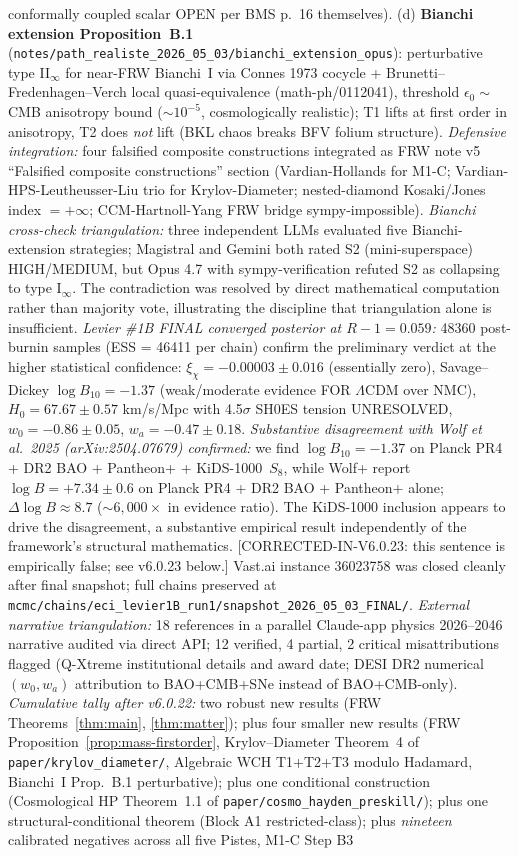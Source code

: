 \documentclass[reprint,amsmath,amssymb,aps,prd,superscriptaddress]{revtex4-2}
\providecommand{\1}{\mathbf{1}}
\begin{document}
conformally coupled scalar OPEN per BMS p.~16 themselves). (d) \textbf{Bianchi extension Proposition~B.1} (\texttt{notes/path\_realiste\_2026\_05\_03/bianchi\_extension\_opus}): perturbative type II$_\infty$ for near-FRW Bianchi~I via Connes 1973 cocycle + Brunetti--Fredenhagen--Verch local quasi-equivalence (math-ph/0112041), threshold $\epsilon_0\sim$ CMB anisotropy bound ($\sim 10^{-5}$, cosmologically realistic); T1 lifts at first order in anisotropy, T2 does \emph{not} lift (BKL chaos breaks BFV folium structure). \emph{Defensive integration:} four falsified composite constructions integrated as FRW note v5 ``Falsified composite constructions'' section (Vardian-Hollands for M1-C; Vardian-HPS-Leutheusser-Liu trio for Krylov-Diameter; nested-diamond Kosaki/Jones index $=+\infty$; CCM-Hartnoll-Yang FRW bridge sympy-impossible). \emph{Bianchi cross-check triangulation:} three independent LLMs evaluated five Bianchi-extension strategies; Magistral and Gemini both rated S2 (mini-superspace) HIGH/MEDIUM, but Opus 4.7 with sympy-verification refuted S2 as collapsing to type I$_\infty$. The contradiction was resolved by direct mathematical computation rather than majority vote, illustrating the discipline that triangulation alone is insufficient. \emph{Levier \#1B FINAL converged posterior at $R-1=0.059$:} 48360 post-burnin samples (ESS = 46411 per chain) confirm the preliminary verdict at the higher statistical confidence: $\xi_\chi = -0.00003 \pm 0.016$ (essentially zero), Savage--Dickey $\log B_{10} = -1.37$ (weak/moderate evidence FOR $\Lambda$CDM over NMC), $H_0 = 67.67 \pm 0.57$ km/s/Mpc with 4.5$\sigma$ SH0ES tension UNRESOLVED, $w_0 = -0.86 \pm 0.05$, $w_a = -0.47 \pm 0.18$. \emph{Substantive disagreement with Wolf et al.\ 2025 (arXiv:2504.07679) confirmed:} we find $\log B_{10} = -1.37$ on Planck PR4 + DR2 BAO + Pantheon+ + KiDS-1000~$S_8$, while Wolf+ report $\log B = +7.34 \pm 0.6$ on Planck PR4 + DR2 BAO + Pantheon+ alone; $\Delta \log B \approx 8.7$ ($\sim 6{,}000\times$ in evidence ratio). The KiDS-1000 inclusion appears to drive the disagreement, a substantive empirical result independently of the framework's structural mathematics. [CORRECTED-IN-V6.0.23: this sentence is empirically false; see v6.0.23 below.] Vast.ai instance 36023758 was closed cleanly after final snapshot; full chains preserved at \texttt{mcmc/chains/eci\_levier1B\_run1/snapshot\_2026\_05\_03\_FINAL/}. \emph{External narrative triangulation:} 18 references in a parallel Claude-app physics 2026--2046 narrative audited via direct API; 12 verified, 4 partial, 2 critical misattributions flagged (Q-Xtreme institutional details and award date; DESI DR2 numerical $(w_0,w_a)$ attribution to BAO+CMB+SNe instead of BAO+CMB-only). \emph{Cumulative tally after v6.0.22:} two robust new results (FRW Theorems~\ref{thm:main}, \ref{thm:matter}); plus four smaller new results (FRW Proposition~\ref{prop:mass-firstorder}, Krylov--Diameter Theorem~4 of \texttt{paper/krylov\_diameter/}, Algebraic WCH T1+T2+T3 modulo Hadamard, Bianchi~I Prop.~B.1 perturbative); plus one conditional construction (Cosmological HP Theorem~1.1 of \texttt{paper/cosmo\_hayden\_preskill/}); plus one structural-conditional theorem (Block A1 restricted-class); plus \emph{nineteen} calibrated negatives across all five Pistes, M1-C Step B3 
\end{document}
